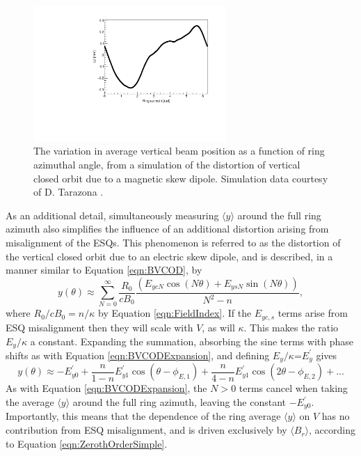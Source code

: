 \begin{figure}[t!]
\centering{}
\includegraphics[trim={0 0 0 0},clip,width=0.65\textwidth]{Images/Chapter4/ClosedOrbitSim.pdf}
\caption{The variation in average vertical beam position as a function of ring azimuthal angle, from a simulation of the distortion of vertical closed orbit due to a magnetic skew dipole. Simulation data courtesy of D. Tarazona \cite{Tarazona}.}
\label{fig:ClosedOrbitSim}
\end{figure}

As an additional detail, simultaneously measuring $\langle y \rangle$ around the full ring azimuth also simplifies the influence of an additional distortion arising from misalignment of the ESQs. This phenomenon is referred to as the distortion of the vertical closed orbit due to an electric skew dipole, and is described, in a manner similar to Equation \ref{eqn:BVCOD}, by
%
\begin{equation} 
  y(\theta) \approx \sum_{N=0}^{\infty} \frac{R_{0}}{cB_{0}} \frac{(E_{ycN}\cos(N\theta)+E_{ysN}\sin(N\theta))}{N^{2}-n},
  \label{eqn:EVCOD}
\end{equation}
%
where $R_{0}/cB_{0} = n / \kappa$ by Equation \ref{eqn:FieldIndex}. If the $E_{y c,s}$ terms arise from ESQ misalignment then they will scale with $V$, as will $\kappa$. This makes the ratio $E_{y}/\kappa$ a constant. Expanding the summation, absorbing the sine terms with phase shifts as with Equation \ref{eqn:BVCODExpansion}, and defining $E_{y}/\kappa$=$E_{y}^{\prime}$ gives
%
\begin{equation} 
  y(\theta) \approx -E_{y0}^{\prime} + \frac{n}{1-n}E_{y1}^{\prime}\cos(\theta-\phi_{E,1}) + \frac{n}{4-n} E_{y1}^{\prime}\cos(2\theta-\phi_{E,2})+ ...
  \label{eqn:EVODExpansion}
\end{equation}
%
As with Equation \ref{eqn:BVCODExpansion}, the $N>0$ terms cancel when taking the average $\langle y \rangle$ around the full ring azimuth, leaving the constant $-E_{y0}^{\prime}$. Importantly, this means that the dependence of the ring average $\langle y \rangle$ on $V$ has no contribution from ESQ misalignment, and is driven exclusively by $\langle B_{r} \rangle$, according to Equation \ref{eqn:ZerothOrderSimple}.

